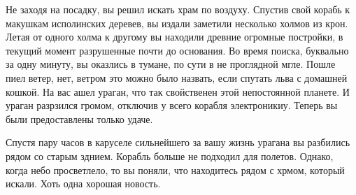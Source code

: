 Не заходя на посадку, вы решил искать храм по воздуху.
Спустив свой корабь к макушкам исполинских деревев, вы издали заметили несколько холмов из крон.
Летая от одного холма к другому вы находили древние огромные постройки, в текущий момент разрушенные почти до основания.
Во время поиска, буквально за одну минуту, вы оказлись в тумане, по сути в не проглядной мгле.
Пошле пиел ветер, нет, ветром это можно было назвать, если спутать льва с домашней кошкой. 
На вас ашел ураган, что так свойственен этой непостоянной планете.
И ураган разрзился громом, отключив у всего корабля электроникиу.
Теперь вы были предоставлены только удаче.

Спустя пару часов в каруселе сильнейшего за вашу жизнь урагана вы разбились рядом со старым зднием.
Корабль больше не подходил для полетов.
Однако, когда небо просветлело, то вы поняли, что находитесь рядом с хрмом, который искали.
Хоть одна хорошая новость.